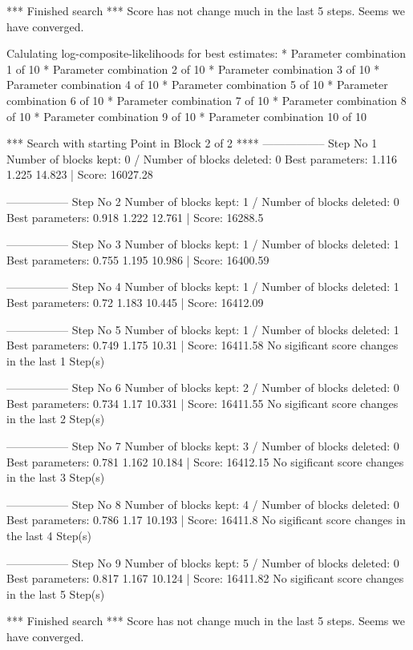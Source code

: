 \begin{Schunk}
\begin{Soutput}
*** Finished search *** 
Score has not change much in the last 5 steps. 
Seems we have converged. 

Calulating log-composite-likelihoods for best estimates: 
* Parameter combination 1 of 10 
* Parameter combination 2 of 10 
* Parameter combination 3 of 10 
* Parameter combination 4 of 10 
* Parameter combination 5 of 10 
* Parameter combination 6 of 10 
* Parameter combination 7 of 10 
* Parameter combination 8 of 10 
* Parameter combination 9 of 10 
* Parameter combination 10 of 10 

*** Search with starting Point in Block 2 of 2 **** 
----------------- 
Step No 1 
Number of blocks kept: 0  / Number of blocks deleted: 0 
Best parameters:  1.116 1.225 14.823 | Score: 16027.28 

----------------- 
Step No 2 
Number of blocks kept: 1  / Number of blocks deleted: 0 
Best parameters:  0.918 1.222 12.761 | Score: 16288.5 

----------------- 
Step No 3 
Number of blocks kept: 1  / Number of blocks deleted: 1 
Best parameters:  0.755 1.195 10.986 | Score: 16400.59 

----------------- 
Step No 4 
Number of blocks kept: 1  / Number of blocks deleted: 1 
Best parameters:  0.72 1.183 10.445 | Score: 16412.09 

----------------- 
Step No 5 
Number of blocks kept: 1  / Number of blocks deleted: 1 
Best parameters:  0.749 1.175 10.31 | Score: 16411.58 
No sigificant score changes in the last 1 Step(s) 

----------------- 
Step No 6 
Number of blocks kept: 2  / Number of blocks deleted: 0 
Best parameters:  0.734 1.17 10.331 | Score: 16411.55 
No sigificant score changes in the last 2 Step(s) 

----------------- 
Step No 7 
Number of blocks kept: 3  / Number of blocks deleted: 0 
Best parameters:  0.781 1.162 10.184 | Score: 16412.15 
No sigificant score changes in the last 3 Step(s) 

----------------- 
Step No 8 
Number of blocks kept: 4  / Number of blocks deleted: 0 
Best parameters:  0.786 1.17 10.193 | Score: 16411.8 
No sigificant score changes in the last 4 Step(s) 

----------------- 
Step No 9 
Number of blocks kept: 5  / Number of blocks deleted: 0 
Best parameters:  0.817 1.167 10.124 | Score: 16411.82 
No sigificant score changes in the last 5 Step(s) 

*** Finished search *** 
Score has not change much in the last 5 steps. 
Seems we have converged. 


\end{Soutput}
\end{Schunk}
